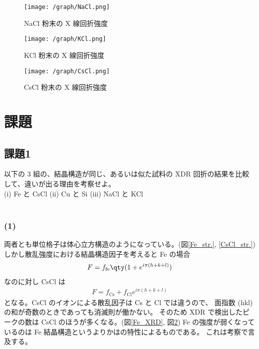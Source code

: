 \documentclass[11pt,dvipdfmx,a4paper]{jsarticle}
\begin{document}
\begin{figure}[h]
	\centering
	\begin{minipage}[t]{0.48\columnwidth}
		\centering
		\texttt{[image: /graph/NaCl.png]}
		\caption{NaCl 粉末の X 線回折強度}
		\label{NaCl_XRD}
	\end{minipage}
	\hfil
	\begin{minipage}[t]{0.48\columnwidth}
		\centering
		\texttt{[image: /graph/KCl.png]}
		\caption{KCl 粉末の X 線回折強度}
		\label{KCl_XRD}
	\end{minipage}
\end{figure}
\begin{figure}[h]
	\centering
	\begin{minipage}[t]{0.48\columnwidth}
		\centering
		\texttt{[image: /graph/CsCl.png]}
		\caption{CsCl 粉末の X 線回折強度}
		\label{CsCl_XRD}
	\end{minipage}
\end{figure}

\section{課題}
\subsection*{課題1}
以下の 3 組の、結晶構造が同じ、あるいは似た試料の XDR 回折の結果を比較して、違いが出る理由を考察せよ。\\
(i) Fe と CsCl \quad (ii) Cu と Si \quad (iii) NaCl と KCl\\ \\

\subsubsection*{(1)}
両者とも単位格子は体心立方構造のようになっている。(図\ref{Fe_str.}, \ref{CsCl_str.})
しかし散乱強度における結晶構造因子を考えると Fe の場合
\begin{align}
	F = f_{\text{fe}}\qty(1+e^{i\pi(h+k+l)})
\end{align}
なのに対し CsCl は
\begin{align}
	F = f_{\text{Cs}}+f_{\text{Cl}}e^{i\pi(h+k+l)}
\end{align}
となる。CsCl のイオンによる散乱因子は Cs と Cl では違うので、
面指数 (hkl) の和が奇数のときであっても消滅則が働かない。
そのため XDR で検出したピークの数は CsCl のほうが多くなる。(図\ref{Fe_XRD}, 図\ref{CsCl_XRD})
Fe の強度が弱くなっているのは Fe 結晶構造というよりかはの特性によるものである。
これは考察で言及する。\\
\end{document}
